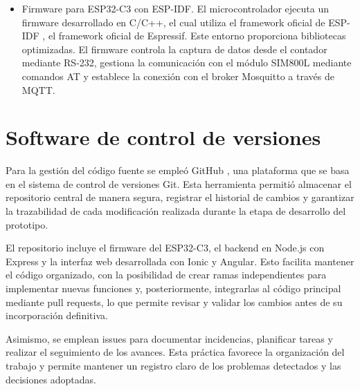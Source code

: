 \begin{itemize}
\item  Firmware para ESP32-C3 con ESP-IDF.
El microcontrolador ejecuta un firmware desarrollado en C/C++, el cual utiliza el framework oficial de ESP-IDF \cite{espidf}, el framework oficial de Espressif. Este entorno proporciona bibliotecas optimizadas. El firmware controla la captura de datos desde el contador mediante RS-232, gestiona la comunicación con el módulo SIM800L mediante comandos AT y establece la conexión con el broker Mosquitto a través de MQTT.

\end{itemize}


\section{Software de control de versiones}
Para la gestión del código fuente se empleó GitHub \cite{github}, una plataforma que se basa en el sistema de control de versiones Git. Esta herramienta permitió almacenar el repositorio central de manera segura, registrar el historial de cambios y garantizar la trazabilidad de cada modificación realizada durante la etapa de desarrollo del prototipo.

El repositorio incluye el firmware del ESP32-C3, el backend en Node.js con Express y la interfaz web desarrollada con Ionic y Angular. Esto facilita mantener el código organizado, con la posibilidad de crear ramas independientes para implementar nuevas funciones y, posteriormente, integrarlas al código principal mediante pull requests, lo que permite revisar y validar los cambios antes de su incorporación definitiva.

Asimismo, se emplean issues para documentar incidencias, planificar tareas y realizar el seguimiento de los avances. Esta práctica favorece la organización del trabajo y permite mantener un registro claro de los problemas detectados y las decisiones adoptadas.


